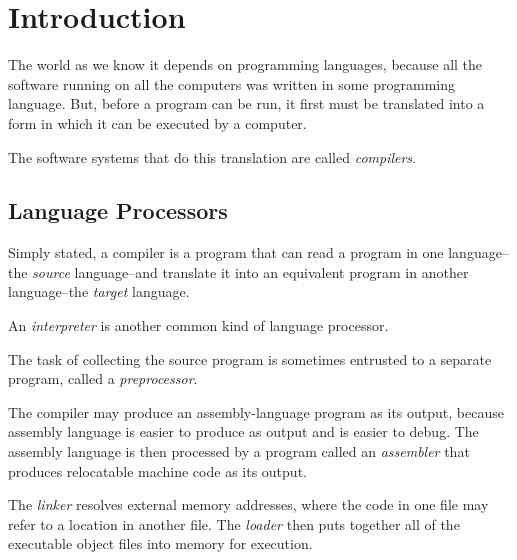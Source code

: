 \documentclass[a4paper,twoside]{book}
\begin{document}

\restoregeometry
\thispagestyle{empty}
\setcounter{page}{0}
\tableofcontents
\thispagestyle{empty}
\setcounter{page}{0}

\chapter{Introduction}

The world as we know it depends on programming languages, because all the software running on all the computers was written in some programming language. But, before a program can be run, it first must be translated into a form in which it can be executed by a computer.

The software systems that do this translation are called \textit{compilers}.

\section{Language Processors}

Simply stated, a compiler is a program that can read a program in one language--the \textit{source} language--and translate it into an equivalent program in another language--the \textit{target} language.

An \textit{interpreter} is another common kind of language processor.

The task of collecting the source program is sometimes entrusted to a separate program, called a \textit{preprocessor}.

The compiler may produce an assembly-language program as its output, because assembly language is easier to produce as output and is easier to debug. The assembly language is then processed by a program called an \textit{assembler} that produces relocatable machine code as its output.

The \textit{linker} resolves external memory addresses, where the code in one file may refer to a location in another file. The \textit{loader} then puts together all of the executable object files into memory for execution.
\end{document}
